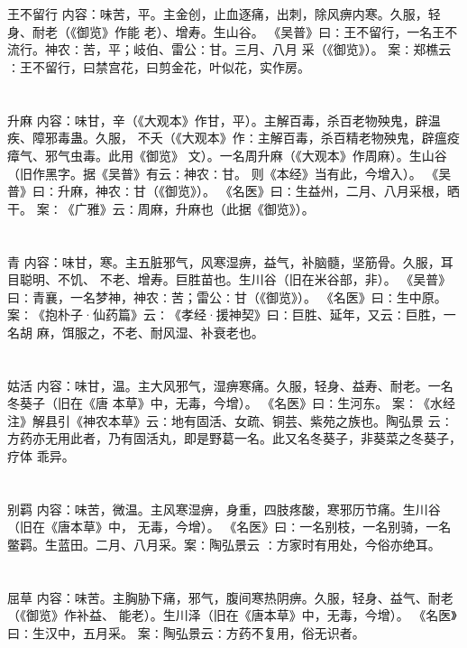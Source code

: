 \documentclass[12pt,UTF8]{ctexbook}
\begin{document}
\chapter{}王不留行
内容：味苦，平。主金创，止血逐痛，出刺，除风痹内寒。久服，轻身、耐老（《御览》作能 
老）、增寿。生山谷。 
《吴普》曰∶王不留行，一名王不流行。神农∶苦，平；岐伯、雷公∶甘。三月、八月 
采（《御览》）。 
案∶郑樵云∶王不留行，曰禁宫花，曰剪金花，叶似花，实作房。 


\chapter{}升麻
内容：味甘，辛（《大观本》作甘，平）。主解百毒，杀百老物殃鬼，辟温疾、障邪毒蛊。久服， 
不夭（《大观本》作∶主解百毒，杀百精老物殃鬼，辟瘟疫瘴气、邪气虫毒。此用《御览》 
文）。一名周升麻（《大观本》作周麻）。生山谷（旧作黑字。据《吴普》有云∶神农∶甘。 
则《本经》当有此，今增入）。 
《吴普》曰∶升麻，神农∶甘（《御览》）。 
《名医》曰∶生益州，二月、八月采根，晒干。 
案∶《广雅》云∶周麻，升麻也（此据《御览》）。 


\chapter{}青
内容：味甘，寒。主五脏邪气，风寒湿痹，益气，补脑髓，坚筋骨。久服，耳目聪明、不饥、 
不老、增寿。巨胜苗也。生川谷（旧在米谷部，非）。 
《吴普》曰∶青襄，一名梦神，神农∶苦；雷公∶甘（《御览》）。 
《名医》曰∶生中原。 
案∶《抱朴子·仙药篇》云∶《孝经·援神契》曰∶巨胜、延年，又云∶巨胜，一名胡 
麻，饵服之，不老、耐风湿、补衰老也。 


\chapter{}姑活
内容：味甘，温。主大风邪气，湿痹寒痛。久服，轻身、益寿、耐老。一名冬葵子（旧在《唐 
本草》中，无毒，今增）。 
《名医》曰∶生河东。 
案∶《水经注》解县引《神农本草》云∶地有固活、女疏、铜芸、紫苑之族也。陶弘景 
云∶方药亦无用此者，乃有固活丸，即是野葛一名。此又名冬葵子，非葵菜之冬葵子，疗体 
乖异。 


\chapter{}别羁
内容：味苦，微温。主风寒湿痹，身重，四肢疼酸，寒邪历节痛。生川谷（旧在《唐本草》中， 
无毒，今增）。 
《名医》曰∶一名别枝，一名别骑，一名鳖羁。生蓝田。二月、八月采。案∶陶弘景云 
∶方家时有用处，今俗亦绝耳。 


\chapter{}屈草
内容：味苦。主胸胁下痛，邪气，腹间寒热阴痹。久服，轻身、益气、耐老（《御览》作补益、 
能老）。生川泽（旧在《唐本草》中，无毒，今增）。 
《名医》曰∶生汉中，五月采。 
案∶陶弘景云∶方药不复用，俗无识者。 
\end{document}
